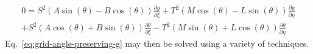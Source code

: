 \begin{equation}
\label{eq:grid-angle-preserving-g}
\begin{array}{c}
0 = {S^2}\left( {A\sin \left( \theta  \right) - B\cos \left( \theta  \right)} \right)\frac{{\partial g}}{{\partial \xi }} + {T^2}\left( {M\cos \left( \theta  \right) - L\sin \left( \theta  \right)} \right)\frac{{\partial g}}{{\partial \eta }}\\
 + {S^2}\left( {A\cos \left( \theta  \right) + B\sin \left( \theta  \right)} \right)\frac{{\partial \theta }}{{\partial \xi }} - {T^2}\left( {M\sin \left( \theta  \right) + L\cos \left( \theta  \right)} \right)\frac{{\partial \theta }}{{\partial \eta }}
\end{array}
\end{equation}
Eq.~\ref{eq:grid-angle-preserving-g} may then be solved using a variety of techniques.

